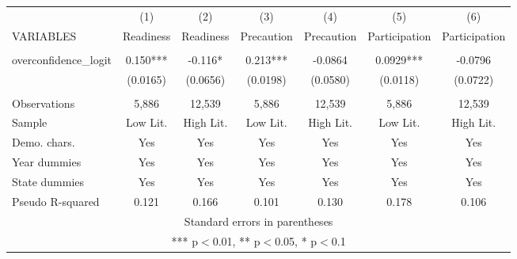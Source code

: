 \documentclass[]{article}
\begin{document}
\begin{tabular}{lcccccc} \hline
 & (1) & (2) & (3) & (4) & (5) & (6) \\
VARIABLES & Readiness & Readiness & Precaution & Precaution & Participation & Participation \\ \hline
 &  &  &  &  &  &  \\
overconfidence\_logit & 0.150*** & -0.116* & 0.213*** & -0.0864 & 0.0929*** & -0.0796 \\
 & (0.0165) & (0.0656) & (0.0198) & (0.0580) & (0.0118) & (0.0722) \\
 &  &  &  &  &  &  \\
Observations & 5,886 & 12,539 & 5,886 & 12,539 & 5,886 & 12,539 \\
Sample & Low Lit. & High Lit. & Low Lit. & High Lit. & Low Lit. & High Lit. \\
Demo. chars. & Yes & Yes & Yes & Yes & Yes & Yes \\
Year dummies & Yes & Yes & Yes & Yes & Yes & Yes \\
State dummies & Yes & Yes & Yes & Yes & Yes & Yes \\
 Pseudo R-squared & 0.121 & 0.166 & 0.101 & 0.130 & 0.178 & 0.106 \\ \hline
\multicolumn{7}{c}{ Standard errors in parentheses} \\
\multicolumn{7}{c}{ *** p$<$0.01, ** p$<$0.05, * p$<$0.1} \\
\end{tabular}
\end{document}
